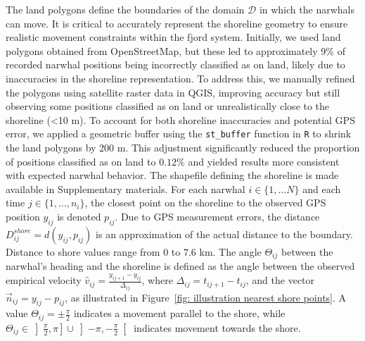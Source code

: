 \documentclass[aoas]{imsart}
\theoremstyle{definition}
\theoremstyle{remark}
\theoremstyle{remark}
\newcommand {\1}{\mathbb{1}}
\begin{document}
The land polygons define the boundaries of the domain $\mathcal{D}$ in which the narwhals can move. It is critical to accurately represent the shoreline geometry to ensure realistic movement constraints within the fjord system. Initially, we used land polygons obtained from OpenStreetMap, but these led to approximately $9\%$ of recorded narwhal positions being incorrectly classified as on land, likely due to inaccuracies in the shoreline representation. To address this, we manually refined the polygons using satellite raster data in QGIS, improving accuracy but still observing some positions classified as on land or unrealistically close to the shoreline (<10 m). To account for both shoreline inaccuracies and potential GPS error, we applied a geometric buffer using the \texttt{st\_buffer} function in \texttt{R} to shrink the land polygons by 200 m. This adjustment significantly reduced the proportion of positions classified as on land to $0.12\%$ and yielded results more consistent with expected narwhal behavior. The shapefile defining the shoreline is made available in Supplementary materials. For each narwhal $i \in\{1, \ldots N\}$ and each time $j\in\{1, \ldots, n_i\}$, the closest point on the shoreline to the observed GPS position $y_{ij}$  is denoted $p_{ij}$. Due to GPS measurement errors, the distance $D^{shore}_{ij}=d(y_{ij},p_{ij})$ is an approximation of the actual distance to the boundary. Distance to shore values range from $0$ to $7.6$ km.
The angle $\Theta_{ij}$ between the narwhal's heading and the shoreline is defined as the angle between the observed empirical velocity $\hat{v}_{ij}=\frac{y_{ij+1}-y_{ij}}{\Delta_{ij}}$, where $\Delta_{ij}=t_{ij+1}-t_{ij}$, and the vector $\vec{n}_{ij}=y_{ij}-p_{ij}$, as illustrated in Figure~\ref{fig: illustration nearest shore points}. A value $\Theta_{ij}=\pm \frac{\pi}{2}$ indicates a movement parallel to the shore, while $\Theta_{ij} \in \left]\frac{\pi}{2},\pi\right] \cup \left]-\pi,-\frac{\pi}{2}\right[$ indicates movement towards the shore. 
\end{document}
